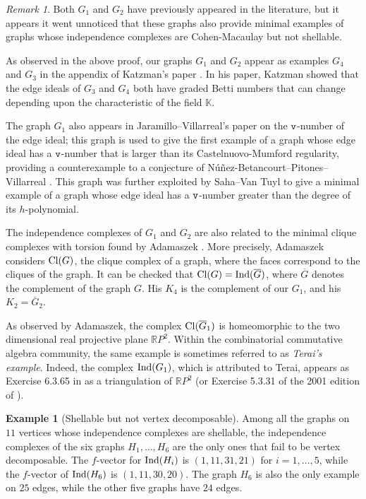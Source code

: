 \documentclass[12pt]{amsart}
\theoremstyle{plain}
\theoremstyle{definition}
\newtheorem{example}[theorem]{Example}
\theoremstyle{remark}
\newtheorem{remark}[theorem]{Remark}
\numberwithin{equation}{section}
\numberwithin{equation}{section}
\begin{document}
\begin{remark}
    Both $G_1$ and $G_2$ have previously appeared in the literature,
    but it appears it went unnoticed that
    these graphs also provide minimal examples of graphs
    whose independence complexes are Cohen-Macaulay but not
    shellable.  

    As observed in the above proof,
    our graphs $G_1$ and $G_2$ appear as examples $G_4$ and $G_3$ in the appendix of 
    Katzman's paper \cite{K2006}.    
    In his paper, Katzman showed that the edge ideals of 
    $G_3$ and $G_4$ both have graded Betti numbers
    that can change depending upon the characteristic of the
    field $\mathbb{K}$.  
   
    The graph $G_1$ also appears 
    in Jaramillo--Villarreal's paper
    \cite[Example 5.4]{JV2021} on the ${\tt v}$-number of the
    edge ideal; this graph is used to give the first example
    of a graph whose edge ideal has a
    ${\tt v}$-number that is larger than its
    Castelnuovo-Mumford regularity, providing a counterexample
    to a conjecture of N\'u\~nez-Betancourt--Pitones--Villarreal 
    \cite{NPV2018}.  This graph was further exploited
    by Saha--Van Tuyl \cite[Theorem 3.1]{SVT2026} to give a minimal example
    of a graph whose edge ideal has a
    ${\tt v}$-number greater than the
    degree of its $h$-polynomial.

The  independence complexes of $G_1$ and $G_2$ 
are also related to the minimal clique complexes with torsion found by 
Adamaszek \cite[Theorem 1]{A2014}.   More precisely,
Adamaszek considers
${\rm Cl}(G)$, the clique complex of a graph, where the faces
correspond to the cliques of the graph.  It can be checked
that ${\rm Cl}(G) = {\rm Ind}(\overline{G})$, where $\overline{G}$ denotes
the complement of the graph $G$.  His $K_4$ is the complement of our
$G_1$, and his $K_2 = \overline{G}_2$.

As observed by Adamaszek, the complex ${\rm Cl}(\overline{G}_1)$  
is homeomorphic to the two dimensional 
real projective plane $\mathbb{R}P^2$. Within
the combinatorial commutative algebra community, the same example
is sometimes referred to as {\it Terai's example}.  Indeed, 
the complex ${\rm Ind}(G_1)$, which is attributed to Terai, 
appears as Exercise 6.3.65 in \cite{VBook}
as a triangulation of $\mathbb{R}P^2$ (or Exercise 5.3.31 
of the 2001 edition of \cite{VBook}).
\end{remark}

\begin{example}[Shellable but not vertex decomposable]\label{ex:shellablebutnotvd}
Among all the graphs on $11$ vertices
whose independence complexes are 
shellable, the independence complexes
of the six graphs $H_1,\ldots,H_6$ are the only ones that
fail to
be vertex decomposable.  The $f$-vector 
for ${\rm Ind}(H_i)$ is $(1,11,31,21)$ for $i=1,\ldots,5$,
while the $f$-vector of ${\rm Ind}(H_6)$ is $(1,11,30,20)$.  
The graph $H_6$ is also the only example on $25$ edges,
while the other five graphs have $24$ edges.
\end{example}
\end{document}

